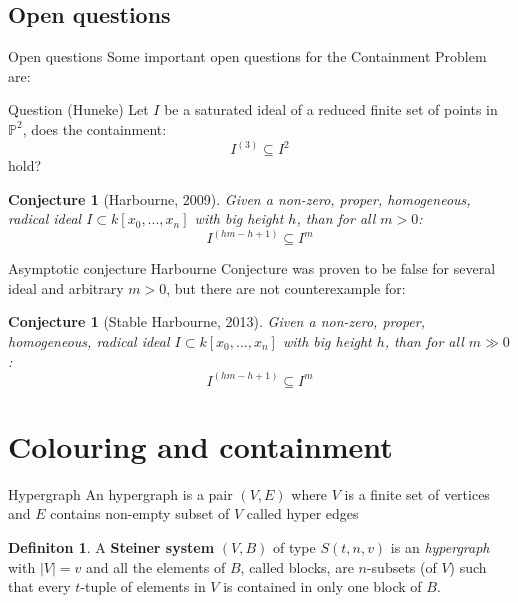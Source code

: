 \documentclass[dvipsnames]{beamer}
\theoremstyle{plain}
\newtheorem{conj}[teo]{Conjecture}
\theoremstyle{remark}
\theoremstyle{definition}
\newtheorem{deff}[teo]{Definiton}
\newcommand{\PP}{\mathbb{P}}
\newcommand{\cont}[2]{ I^{(#1)} \subseteq I^{#2}}
\begin{document}
\subsection{Open questions}

\begin{frame}{Open questions}
Some important open questions for the Containment Problem are:
\begin{alertblock}{Question (Huneke)}
Let $ I $ be a saturated ideal of a reduced finite set of points in $ \PP^2 $, does the containment:
	\[ \cont{3}{2} \]
hold?
\end{alertblock}
\pause
\begin{conj}[Harbourne, 2009]\label{conj:harb}
		Given a non-zero, proper, homogeneous, radical ideal $ I \subset k[x_0 , ... , x_n] $ with big height $ h $, than for all $ m > 0 $:
		\[
		\cont{hm - h +1}{m}
		\]
	\end{conj}
\end{frame}

\begin{frame}{Asymptotic conjecture}
Harbourne Conjecture was proven to be false for several ideal and arbitrary $ m>0 $, but there are not counterexample for:
\begin{conj}[Stable Harbourne, 2013]\label{conj:stabharb}
		Given a non-zero, proper, homogeneous, radical ideal $ I \subset k[x_0 , ... , x_n] $ with big height $ h $, than for all $ m \gg 0 $:
		\[
		\cont{hm - h +1}{m}
		\]
	\end{conj}
\end{frame}

\section{Colouring and containment}

\begin{frame}{Hypergraph}
An hypergraph is a pair $ (V,E) $ where $ V $ is a finite set of vertices and $ E $ contains non-empty subset of $ V $ called hyper edges
\begin{deff}
A \textbf{Steiner system} $ (V,B) $ of type $ S(t,n,v) $ is an \textit{hypergraph} with $ |V|=v $ and all the elements of $ B $, called blocks, are $ n $-subsets (of $ V $) such that every $ t $-tuple of elements in $ V $ is contained in only one block of $ B $.
\end{deff}
\end{frame}
\end{document}
